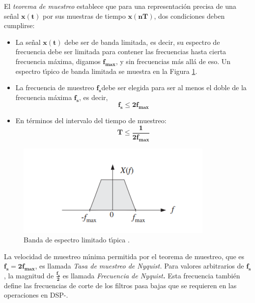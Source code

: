 El \emph{teorema de muestreo} establece que para una representaci\'{o}n
precisa de una se\~{n}al $\mathbf{x(t)}$ por sus muestras de tiempo
$\mathbf{x(nT)}$, dos condiciones deben cumplirse:
\begin{itemize}
\item La se\~{n}al $\mathbf{x(t)}$ debe ser de banda limitada, es decir,
su espectro de frecuencia debe ser limitada para contener las frecuencias
hasta cierta frecuencia m\'{a}xima, digamos $\mathbf{f_{max}}$, y
sin frecuencias m\'{a}s all\'{a} de eso. Un espectro t\'{\i}pico de
banda limitada se muestra en la Figura \ref{fig:Banda-de-espectro}.
\item La frecuencia de muestreo $\mathbf{f_{s}}$debe ser elegida para ser
al menos el doble de la frecuencia m\'{a}xima $\mathbf{f_{s}}$, es
decir,
\begin{equation}
\mathbf{f_{s}\leq2f_{max}}
\end{equation}
\item En t\'{e}rminos del intervalo del tiempo de muestreo:
\begin{equation}
\mathbf{T\leq\frac{1}{2f_{max}}}
\end{equation}
\end{itemize}
\begin{figure}[H]
\begin{centering}
\includegraphics[scale=0.7]{img/sampling_theorem}
\par\end{centering}
\caption{Banda de espectro limitado t\'{\i}pica \cite{dsp_introduction}.\label{fig:Banda-de-espectro}}

\end{figure}

La velocidad de muestreo m\'{\i}nima permitida por el teorema de muestreo,
que es $\mathbf{f_{s}=2f_{max}}$, es llamada \emph{Tasa de muestreo
de Nyquist. }Para valores arbitrarios de $\mathbf{f_{s}}$, la magnitud
de $\mathbf{\mathbf{\frac{f_{s}}{2}}}$ es llamada \emph{Frecuencia
de Nyquist}\textbf{\emph{. }}Esta frecuencia tambi\'{e}n define\textbf{
}las frecuencias de corte de los filtros pasa bajas que se requieren
en las operaciones en DSP-.

